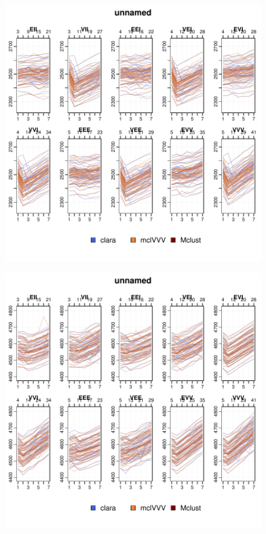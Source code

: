 \begin{figure}
    \centering
\includegraphics{App_plots-012}
\end{figure}

\begin{figure}
    \centering
\includegraphics{App_plots-013}
\end{figure}

